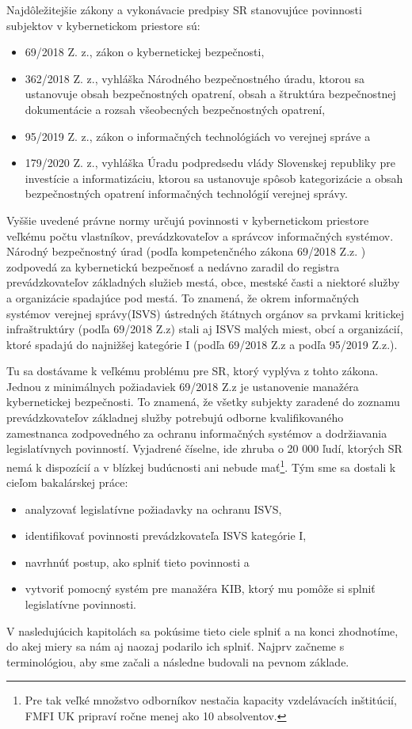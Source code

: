 Najdôležitejšie zákony a vykonávacie predpisy SR stanovujúce povinnosti subjektov v kybernetickom priestore sú:
\begin{itemize}
  \item 69/2018 Z. z., zákon o kybernetickej bezpečnosti,
  \item 362/2018 Z. z., vyhláška Národného bezpečnostného úradu, ktorou sa ustanovuje obsah bezpečnostných opatrení,
    obsah a štruktúra bezpečnostnej dokumentácie a rozsah všeobecných bezpečnostných opatrení,
  \item 95/2019 Z. z., zákon o informačných technológiách vo verejnej správe a
  \item 179/2020 Z. z., vyhláška Úradu podpredsedu vlády Slovenskej republiky pre investície a informatizáciu, ktorou
    sa ustanovuje spôsob kategorizácie a obsah bezpečnostných opatrení informačných technológií verejnej správy.
\end{itemize}

Vyššie uvedené právne normy určujú povinnosti v kybernetickom priestore veľkému počtu vlastníkov, prevádzkovateľov a
správcov informačných systémov. Národný bezpečnostný úrad (podľa kompetenčného zákona 69/2018 Z.z. \cite[\S 5, ods. 1]{69/2018})
zodpovedá za kybernetickú bezpečnosť a nedávno zaradil do registra prevádzkovateľov základných služieb mestá, obce,
mestské časti a niektoré služby a organizácie spadajúce pod mestá. To znamená, že okrem informačných systémov verejnej
správy(ISVS) ústredných štátnych orgánov sa prvkami kritickej infraštruktúry (podľa 69/2018 Z.z) stali aj ISVS malých 
miest, obcí a organizácií, ktoré spadajú do najnižšej kategórie I (podľa 69/2018 Z.z a podľa 95/2019 Z.z.).


Tu sa dostávame k veľkému problému pre SR, ktorý vyplýva z tohto zákona. Jednou z minimálnych požiadaviek 69/2018 Z.z
\cite[\S 20, ods. 4, písm a)]{69/2018} je ustanovenie manažéra kybernetickej bezpečnosti. To znamená, že všetky subjekty
zaradené do zoznamu prevádzkovateľov základnej služby potrebujú odborne kvalifikovaného zamestnanca zodpovedného za ochranu
informačných systémov a dodržiavania legislatívnych povinností. Vyjadrené číselne, ide zhruba o 20 000 ľudí, ktorých SR
nemá k dispozícií a v blízkej budúcnosti ani nebude mať\footnote{Pre tak veľké množstvo odborníkov nestačia kapacity
vzdelávacích inštitúcií, FMFI UK pripraví ročne menej ako 10 absolventov.}. Tým sme sa dostali
k cieľom bakalárskej práce:
\begin{itemize}
  \item analyzovať legislatívne požiadavky na ochranu ISVS,
  \item identifikovať povinnosti prevádzkovateľa ISVS kategórie I, 
  \item navrhnúť postup, ako splniť tieto povinnosti a
  \item vytvoriť pomocný systém pre manažéra KIB, ktorý mu pomôže si splniť legislatívne povinnosti.
\end{itemize}
V nasledujúcich kapitolách sa pokúsime tieto ciele splniť a na konci zhodnotíme, do akej miery sa nám aj naozaj podarilo
ich splniť. Najprv začneme s terminológiou, aby sme začali a následne budovali na pevnom základe. 

